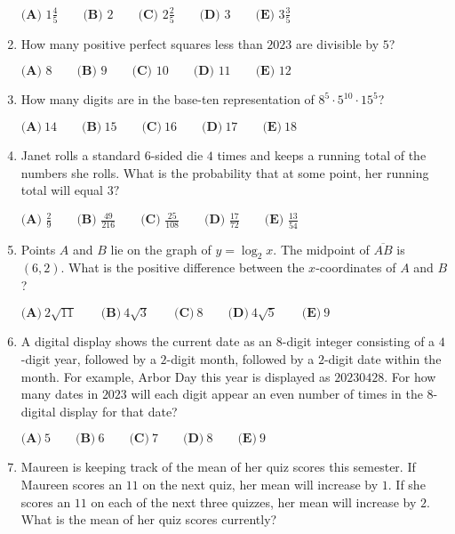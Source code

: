 \documentclass{article}
\begin{document}
\begin{enumerate}[label=\arabic*., itemsep=0.5em]
$\textbf{(A) }1\frac{4}{5}\qquad\textbf{(B) }2\qquad\textbf{(C) }2\frac{2}{5}\qquad\textbf{(D) }3\qquad\textbf{(E) }3\frac{3}{5}$\par \vspace{0.5em}\item How many positive perfect squares less than $2023$ are divisible by $5$?

$\textbf{(A) }8\qquad\textbf{(B) }9\qquad\textbf{(C) }10\qquad\textbf{(D) }11\qquad\textbf{(E) }12$\par \vspace{0.5em}\item How many digits are in the base-ten representation of $8^5 \cdot 5^{10} \cdot 15^5$?

$\textbf{(A)}~14\qquad\textbf{(B)}~15\qquad\textbf{(C)}~16\qquad\textbf{(D)}~17\qquad\textbf{(E)}~18\qquad$\par \vspace{0.5em}\item Janet rolls a standard $6$-sided die $4$ times and keeps a running total of the numbers she rolls. What is the probability that at some point, her running total will equal $3?$

$\textbf{(A) }\frac{2}{9}\qquad\textbf{(B) }\frac{49}{216}\qquad\textbf{(C) }\frac{25}{108}\qquad\textbf{(D) }\frac{17}{72}\qquad\textbf{(E) }\frac{13}{54}$\par \vspace{0.5em}\item Points $A$ and $B$ lie on the graph of $y=\log_{2}x$. The midpoint of $\overline{AB}$ is $(6, 2)$. What is the positive difference between the $x$-coordinates of $A$ and $B$?

$\textbf{(A)}~2\sqrt{11}\qquad\textbf{(B)}~4\sqrt{3}\qquad\textbf{(C)}~8\qquad\textbf{(D)}~4\sqrt{5}\qquad\textbf{(E)}~9$\par \vspace{0.5em}\item A digital display shows the current date as an $8$-digit integer consisting of a $4$-digit year, followed by a $2$-digit month, followed by a $2$-digit date within the month. For example, Arbor Day this year is displayed as $20230428$. For how many dates in $2023$ will each digit appear an even number of times in the 8-digital display for that date?

$\textbf{(A)}~5\qquad\textbf{(B)}~6\qquad\textbf{(C)}~7\qquad\textbf{(D)}~8\qquad\textbf{(E)}~9$\par \vspace{0.5em}\item Maureen is keeping track of the mean of her quiz scores this semester. If Maureen scores an $11$ on the next quiz, her mean will increase by $1$. If she scores an $11$ on each of the next three quizzes, her mean will increase by $2$. What is the mean of her quiz scores currently?


\end{enumerate}
\end{document}
